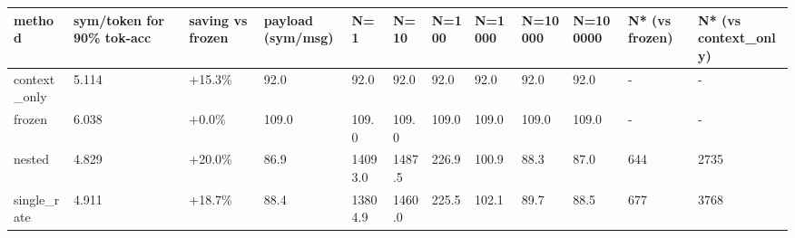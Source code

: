 \begin{tabular}{llllllllllll}
\hline
method & sym/token for 90\% tok-acc & saving vs frozen & payload (sym/msg) & N=1 & N=10 & N=100 & N=1000 & N=10000 & N=100000 & N* (vs frozen) & N* (vs context\_only) \\
\hline
context\_only & 5.114 & +15.3\% & 92.0 & 92.0 & 92.0 & 92.0 & 92.0 & 92.0 & 92.0 & - & - \\
frozen & 6.038 & +0.0\% & 109.0 & 109.0 & 109.0 & 109.0 & 109.0 & 109.0 & 109.0 & - & - \\
nested & 4.829 & +20.0\% & 86.9 & 14093.0 & 1487.5 & 226.9 & 100.9 & 88.3 & 87.0 & 644 & 2735 \\
single\_rate & 4.911 & +18.7\% & 88.4 & 13804.9 & 1460.0 & 225.5 & 102.1 & 89.7 & 88.5 & 677 & 3768 \\
\hline
\end{tabular}
